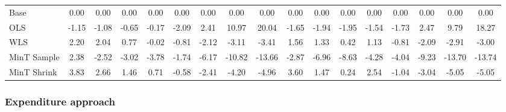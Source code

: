\documentclass[graybox]{svmult}
\begin{document}
\begin{table}[H]
{\begin{tabular}{@{}lSSSSSSSSSSSSSSSS@{}}
		Base & 0.00 & 0.00 & 0.00 & 0.00 & 0.00 & 0.00 & 0.00 & 0.00 & 0.00 & 0.00 & 0.00 & 0.00 & 0.00 & 0.00 & 0.00 & 0.00\\
		
		OLS & -1.15 & -1.08 & -0.65 & -0.17 & -2.09 & 2.41 & 10.97 & 20.04 & -1.65 & -1.94 & -1.95 & -1.54 & -1.73 & 2.47 & 9.79 & 18.27\\
		
		WLS & 2.20 & 2.04 & 0.77 & -0.02 & -0.81 & -2.12 & -3.11 & -3.41 & 1.56 & 1.33 & 0.42 & 1.13 & -0.81 & -2.09 & -2.91 & -3.00\\
		
		MinT Sample & 2.38 & -2.52 & -3.02 & -3.78 & -1.74 & -6.17 & -10.82 & -13.66 & -2.87 & -6.96 & -8.63 & -4.28 & -4.04 & -9.23 & -13.70 & -13.74\\
		
		MinT Shrink & 3.83 & 2.66 & 1.46 & 0.71 & -0.58 & -2.41 & -4.20 & -4.96 & 3.60 & 1.47 & 0.24 & 2.54 & -1.04 & -3.04 & -5.05 & -5.05\\
		\bottomrule
	
	\end{tabular}
}
\end{table}

\subsubsection{Expenditure approach}
\end{document}
